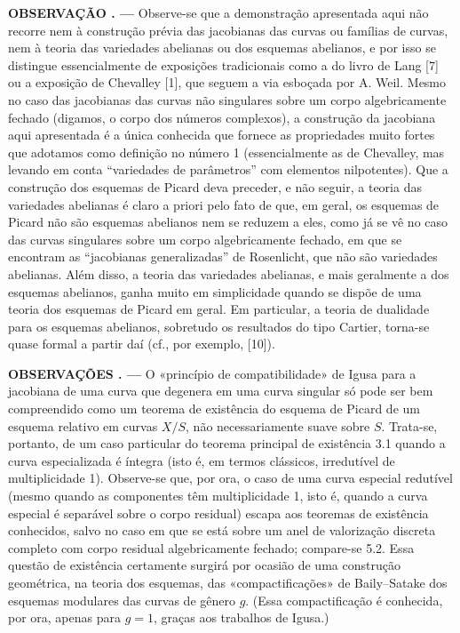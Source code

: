 \documentclass[11pt,twoside,openany]{book}
\numberwithin{equation}{section}
\newcommand{\src}[1]{%
  \phantomsection\hypertarget{src:#1}{}%
  \marginpar{\raggedleft\footnotesize\sffamily #1}%
}
\theoremstyle{plain}
\theoremstyle{definition}
\theoremstyle{remark}
\newcommand{\result}[2]{%
  \par\medskip\noindent\textbf{#1%
  \if\relax\detokenize{#2}\relax\else\space#2\fi. ---}\enspace
}
\newcommand{\FgaUnitKey}{frontmatter}
\renewcommand{\src}[1]{%
  \phantomsection\hypertarget{src:\FgaUnitKey:#1}{}%
  \marginpar{\raggedleft\footnotesize\sffamily #1}%
}
\begin{document}
\result{OBSERVAÇÃO}{5.3} Observe-se que a demonstração apresentada aqui não
recorre nem à construção prévia das jacobianas das curvas ou famílias de curvas,
nem à teoria das variedades abelianas ou dos esquemas abelianos, e por isso se
distingue essencialmente de exposições tradicionais como a do livro de Lang [7]
ou a exposição de Chevalley [1], que seguem a via esboçada por A. Weil. Mesmo no
caso das jacobianas das curvas não singulares sobre um corpo algebricamente
fechado (digamos, o corpo dos números complexos), a construção da jacobiana aqui
apresentada é a única conhecida que fornece as propriedades muito fortes que
adotamos como definição no número 1 (essencialmente as de Chevalley, mas levando
em conta ``variedades de parâmetros'' com elementos nilpotentes). Que a
construção dos esquemas de Picard deva preceder, e não seguir, a teoria das
variedades abelianas é claro a priori pelo fato de que, em geral, os esquemas de
Picard não são esquemas abelianos nem se reduzem a eles, como já se vê no caso
das curvas singulares sobre um corpo algebricamente fechado, em que se encontram
as ``jacobianas generalizadas'' de Rosenlicht, que não são variedades abelianas.
Além disso, a teoria das variedades abelianas, e mais geralmente a dos esquemas
abelianos, ganha muito em simplicidade quando se dispõe de uma teoria dos
esquemas de Picard em geral. Em particular, a teoria de dualidade para os
esquemas abelianos, sobretudo os resultados do tipo Cartier, torna-se quase
formal a partir daí (cf., por exemplo, [10]).
\src{157}
\result{OBSERVAÇÕES}{5.4} O «princípio de compatibilidade» de Igusa para a
jacobiana de uma curva que degenera em uma curva singular só pode ser bem
compreendido como um teorema de existência do esquema de Picard de um esquema
relativo em curvas $X/S$, não necessariamente suave sobre $S$. Trata-se,
portanto, de um caso particular do teorema principal de existência 3.1 quando a
curva especializada é íntegra (isto é, em termos clássicos, irredutível de
multiplicidade 1). Observe-se que, por ora, o caso de uma curva especial
redutível (mesmo quando as componentes têm multiplicidade 1, isto é, quando a
curva especial é separável sobre o corpo residual) escapa aos teoremas de
existência conhecidos, salvo no caso em que se está sobre um anel de valorização
discreta completo com corpo residual algebricamente fechado; compare-se 5.2.
Essa questão de existência certamente surgirá por ocasião de uma construção
geométrica, na teoria dos esquemas, das «compactificações» de Baily--Satake dos
esquemas modulares das curvas de gênero $g$. (Essa compactificação é conhecida,
por ora, apenas para $g=1$, graças aos trabalhos de Igusa.)
\end{document}
